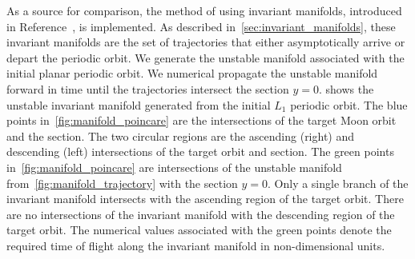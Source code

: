 \documentclass[preprint]{elsarticle}
\begin{document}
As a source for comparison, the method of using invariant manifolds, introduced in Reference~, is implemented.
As described in~\cref{sec:invariant_manifolds}, these invariant manifolds are the set of trajectories that either asymptotically arrive or depart the periodic orbit. 
We generate the unstable manifold associated with the initial planar periodic orbit.
We numerical propagate the unstable manifold forward in time until the trajectories intersect the \Poincare section \( y = 0 \).
 shows the unstable invariant manifold generated from the initial \( L_1\) periodic orbit. 
The blue points in~\cref{fig:manifold_poincare} are the intersections of the target Moon orbit and the \Poincare section.
The two circular regions are the ascending (right) and descending (left) intersections of the target orbit and \Poincare section.
The green points in~\cref{fig:manifold_poincare} are intersections of the unstable manifold from~\cref{fig:manifold_trajectory} with the \Poincare section \( y = 0 \).
Only a single branch of the invariant manifold intersects with the ascending region of the target orbit.
There are no intersections of the invariant manifold with the descending region of the target orbit.
The numerical values associated with the green points denote the required time of flight along the invariant manifold in non-dimensional units.
\end{document}
